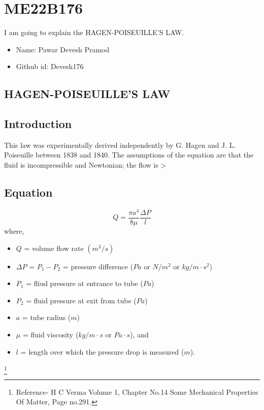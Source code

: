 \section{ME22B176}
I am going to explain the HAGEN-POISEUILLE'S LAW.
\begin{itemize}
\item Name: Pawar Devesh Pramod
\item Github id: Devesh176
\end{itemize}
\subsection{HAGEN-POISEUILLE'S LAW}
\subsection{Introduction}
This law was experimentally derived independently by G. Hagen and J. L. Poiseuille between 1838 and 1840. The assumptions of the equation are that the fluid is incompressible and Newtonian; the flow is >
\subsection{Equation}
\begin{equation}
    Q = \frac{\pi a^{4}}{8\mu} \frac{\Delta P}{l}
\end{equation}
where,
\begin{itemize}
\item $Q$ = volume flow rate $(m^{3}/s)$
\item $\Delta P$ = $P_{1} - P_{2}$ = pressure difference ($Pa$ or $N/m^{2}$ or $kg/m \cdot s^{2}$)
\item $P_{1}$ = fliud pressure at entrance to tube ($Pa$)
\item $P_{2}$ = fluid pressure at exit from tube ($Pa$)
\item $a$ = tube radius ($m$)
\item $\mu$ = fluid viscosity ($kg/m \cdot s$ or $Pa \cdot s$), and
\item $l$ = length over which the pressure drop is measured ($m$).
\end{itemize}
\footnote{Reference- H C Verma Volume 1, Chapter No.14 Some Mechanical Properties Of Matter, Page no.291.}
